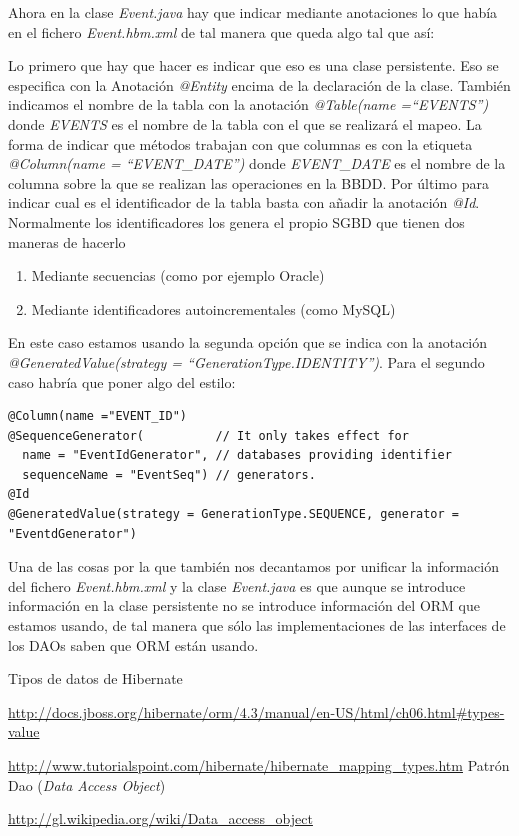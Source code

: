 \documentclass{article}
\begin{document}
	Ahora en la clase \emph{Event.java} hay que indicar mediante anotaciones lo que había en el fichero \emph{Event.hbm.xml} de tal manera que queda algo tal que así:


	Lo primero que hay que hacer es indicar que eso es una clase persistente. Eso se especifica con la Anotación \emph{@Entity} encima de la declaración de la clase. También indicamos el nombre de la tabla con la anotación \emph{@Table(name =``EVENTS'')} donde \emph{EVENTS} es el nombre de la tabla con el que se realizará el mapeo. La forma de indicar que métodos trabajan con que columnas es con la etiqueta \emph{@Column(name = ``EVENT\_DATE'')} donde \emph{EVENT\_DATE} es el nombre de la columna sobre la que se realizan las operaciones en la BBDD. Por último para indicar cual es el identificador de la tabla basta con añadir la anotación \emph{@Id}. Normalmente los identificadores los genera el propio SGBD que tienen dos maneras de hacerlo
{\setlength{\parskip}{0mm}
\begin{enumerate}
	\item Mediante secuencias (como por ejemplo Oracle)
	\item Mediante identificadores autoincrementales (como MySQL)
\end{enumerate}
}

	En este caso estamos usando la segunda opción que se indica con la anotación \emph{@GeneratedValue(strategy = ``GenerationType.IDENTITY'')}. Para el segundo caso habría que poner algo del estilo:
\begin{lstlisting}[style=java]
@Column(name ="EVENT_ID")
@SequenceGenerator(          // It only takes effect for
  name = "EventIdGenerator", // databases providing identifier
  sequenceName = "EventSeq") // generators.
@Id
@GeneratedValue(strategy = GenerationType.SEQUENCE, generator = "EventdGenerator")
\end{lstlisting}

	Una de las cosas por la que también nos decantamos por unificar la información del fichero \emph{Event.hbm.xml} y la clase \emph{Event.java} es que aunque se introduce información en la clase persistente no se introduce información del ORM que estamos usando, de tal manera que sólo las implementaciones de las interfaces de los DAOs saben que ORM están usando.

\clearpage
\newpage
\listoffigures

\clearpage

\renewcommand{\bibname}{Referencias}
\begin{thebibliography}{99}
Tipos de datos de Hibernate

\url{http://docs.jboss.org/hibernate/orm/4.3/manual/en-US/html/ch06.html\#types-value}

\url{http://www.tutorialspoint.com/hibernate/hibernate\_mapping\_types.htm}
Patrón Dao (\textit{Data Access Object})

\url{http://gl.wikipedia.org/wiki/Data_access_object}
\end{thebibliography}
\end{document}
